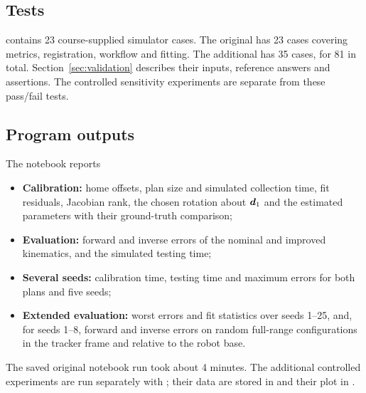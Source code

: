 \documentclass[../main.tex]{subfiles}
\begin{document}
\subsection{Tests}
 contains 23 course-supplied simulator cases. The original  has 23 cases covering metrics, registration, workflow and fitting. The additional  has 35 cases, for 81 in total. Section~\ref{sec:validation} describes their inputs, reference answers and assertions. The controlled sensitivity experiments are separate from these pass/fail tests.
\subsection{Program outputs}
The notebook reports
\begin{itemize}
\setlength{\itemsep}{2pt}
\item \textbf{Calibration:} home offsets, plan size and simulated collection time, fit residuals, Jacobian rank, the chosen rotation about $\bm{d}_1$ and the estimated parameters with their ground-truth comparison;
\item \textbf{Evaluation:} forward and inverse errors of the nominal and improved kinematics, and the simulated testing time;
\item \textbf{Several seeds:} calibration time, testing time and maximum errors for both plans and five seeds;
\item \textbf{Extended evaluation:} worst errors and fit statistics over seeds 1--25, and, for seeds 1--8, forward and inverse errors on random full-range configurations in the tracker frame and relative to the robot base.
\end{itemize}
The saved original notebook run took about 4 minutes. The additional controlled experiments are run separately with ; their data are stored in  and their plot in .
\end{document}
